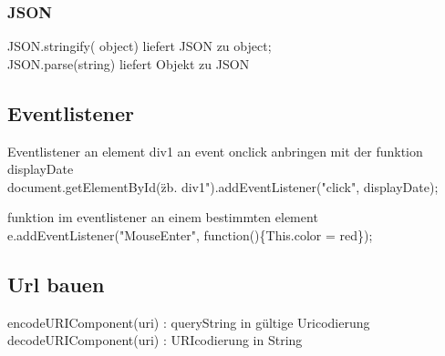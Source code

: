 \subsubsection{JSON}
JSON.stringify( object) liefert JSON zu object; \\
JSON.parse(string) liefert Objekt zu JSON



\subsection{Eventlistener}
Eventlistener an element div1 an event onclick anbringen mit der funktion displayDate\\
document.getElementById(\"zb. div1").addEventListener("click", displayDate);

funktion im eventlistener an einem bestimmten element\\
e.addEventListener("MouseEnter", function()\{This.color = red\});

\subsection{Url bauen}
encodeURIComponent(uri)     : queryString in gültige Uricodierung\\
decodeURIComponent(uri)		: URIcodierung in String

